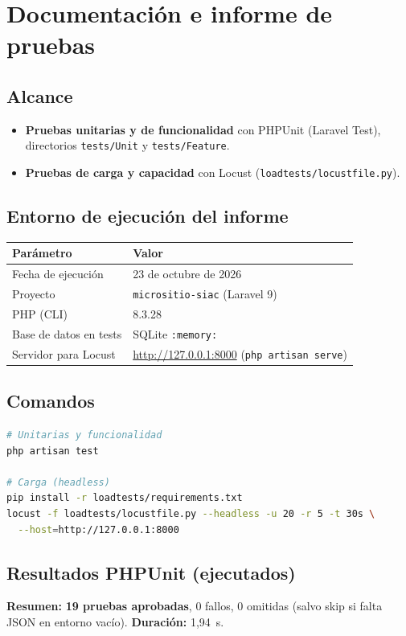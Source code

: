 \chapter{Documentación e informe de pruebas}

\section{Alcance}
\begin{itemize}
  \item \textbf{Pruebas unitarias y de funcionalidad} con PHPUnit (Laravel Test), directorios \texttt{tests/Unit} y \texttt{tests/Feature}.
  \item \textbf{Pruebas de carga y capacidad} con Locust (\texttt{loadtests/locustfile.py}).
\end{itemize}

\section{Entorno de ejecución del informe}
\begin{table}[H]
  \centering
  \begin{tabular}{@{}ll@{}}
    \toprule
    \textbf{Parámetro} & \textbf{Valor} \\
    \midrule
    Fecha de ejecución & 23 de octubre de 2026 \\
    Proyecto & \texttt{micrositio-siac} (Laravel 9) \\
    PHP (CLI) & 8.3.28 \\
    Base de datos en tests & SQLite \texttt{:memory:} \\
    Servidor para Locust & \url{http://127.0.0.1:8000} (\texttt{php artisan serve}) \\
    \bottomrule
  \end{tabular}
\end{table}

\section{Comandos}
\begin{lstlisting}[language=bash]
# Unitarias y funcionalidad
php artisan test

# Carga (headless)
pip install -r loadtests/requirements.txt
locust -f loadtests/locustfile.py --headless -u 20 -r 5 -t 30s \
  --host=http://127.0.0.1:8000
\end{lstlisting}

\section{Resultados PHPUnit (ejecutados)}
\textbf{Resumen:} \textcolor{green!50!black}{\textbf{19 pruebas aprobadas}}, 0 fallos, 0 omitidas (salvo skip si falta JSON en entorno vacío). \textbf{Duración:} 1,94~s.

